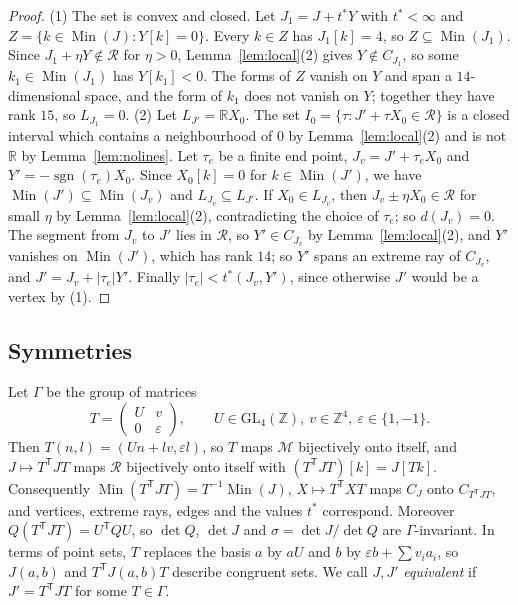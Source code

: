 \documentclass[11pt]{amsart}
\theoremstyle{definition}
\theoremstyle{remark}
\numberwithin{equation}{section}
\numberwithin{table}{section}
\numberwithin{figure}{section}
\newcommand{\R}{\mathbb{R}}
\newcommand{\Z}{\mathbb{Z}}
\newcommand{\M}{\mathcal{M}}
\newcommand{\Rk}{\mathcal{R}}
\newcommand{\Min}{\operatorname{Min}}
\newcommand{\GL}{\mathrm{GL}}
\begin{document}
\begin{proof}
(1) The set is convex and closed. Let $J_1=J+t^*Y$ with $t^*<\infty$ and $Z=\{k\in\Min(J):Y[k]=0\}$. Every $k\in Z$ has $J_1[k]=4$, so $Z\subseteq\Min(J_1)$. Since $J_1+\eta Y\notin\Rk$ for $\eta>0$, Lemma~\ref{lem:local}(2) gives $Y\notin C_{J_1}$, so some $k_1\in\Min(J_1)$ has $Y[k_1]<0$. The forms of $Z$ vanish on $Y$ and span a $14$-dimensional space, and the form of $k_1$ does not vanish on $Y$; together they have rank $15$, so $L_{J_1}=0$.
(2) Let $L_{J'}=\R X_0$. The set $I_0=\{\tau:J'+\tau X_0\in\Rk\}$ is a closed interval which contains a neighbourhood of $0$ by Lemma~\ref{lem:local}(2) and is not $\R$ by Lemma~\ref{lem:nolines}. Let $\tau_e$ be a finite end point, $J_v=J'+\tau_eX_0$ and $Y'=-\operatorname{sgn}(\tau_e)X_0$. Since $X_0[k]=0$ for $k\in\Min(J')$, we have $\Min(J')\subseteq\Min(J_v)$ and $L_{J_v}\subseteq L_{J'}$. If $X_0\in L_{J_v}$, then $J_v\pm\eta X_0\in\Rk$ for small $\eta$ by Lemma~\ref{lem:local}(2), contradicting the choice of $\tau_e$; so $d(J_v)=0$. The segment from $J_v$ to $J'$ lies in $\Rk$, so $Y'\in C_{J_v}$ by Lemma~\ref{lem:local}(2), and $Y'$ vanishes on $\Min(J')$, which has rank $14$; so $Y'$ spans an extreme ray of $C_{J_v}$, and $J'=J_v+|\tau_e|Y'$. Finally $|\tau_e|<t^*(J_v,Y')$, since otherwise $J'$ would be a vertex by (1).
\end{proof}

\subsection{Symmetries}
Let $\Gamma$ be the group of matrices
\[
T=\begin{pmatrix}U&v\\0&\varepsilon\end{pmatrix},\qquad U\in\GL_4(\Z),\ v\in\Z^4,\ \varepsilon\in\{1,-1\}.
\]
Then $T(n,l)=(Un+lv,\varepsilon l)$, so $T$ maps $\M$ bijectively onto itself, and $J\mapsto T^{\mathsf T}JT$ maps $\Rk$ bijectively onto itself with $(T^{\mathsf T}JT)[k]=J[Tk]$. Consequently $\Min(T^{\mathsf T}JT)=T^{-1}\Min(J)$, $X\mapsto T^{\mathsf T}XT$ maps $C_J$ onto $C_{T^{\mathsf T}JT}$, and vertices, extreme rays, edges and the values $t^*$ correspond. Moreover $Q(T^{\mathsf T}JT)=U^{\mathsf T}QU$, so $\det Q$, $\det J$ and $\sigma=\det J/\det Q$ are $\Gamma$-invariant. In terms of point sets, $T$ replaces the basis $a$ by $aU$ and $b$ by $\varepsilon b+\sum v_ia_i$, so $J(a,b)$ and $T^{\mathsf T}J(a,b)T$ describe congruent sets. We call $J,J'$ \emph{equivalent} if $J'=T^{\mathsf T}JT$ for some $T\in\Gamma$.
\end{document}
